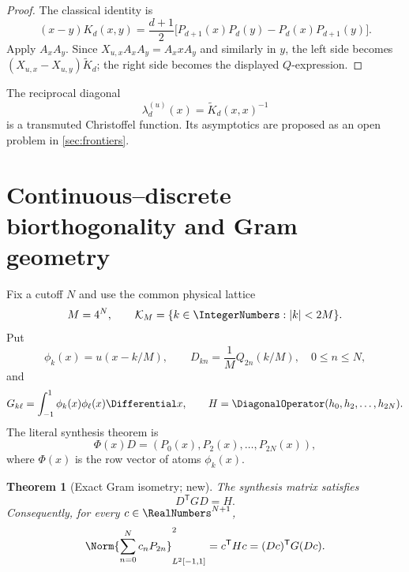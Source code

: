 \documentclass[11pt,oneside]{article}
\numberwithin{equation}{section}
\newtheorem{theorem}{Theorem}[section]
\theoremstyle{definition}
\theoremstyle{remark}
\begin{document}
\begin{proof}
The classical identity is
\[
 (x-y)K_d(x,y)=\frac{d+1}{2}
 \bigl[P_{d+1}(x)P_d(y)-P_d(x)P_{d+1}(y)\bigr].
\]
Apply $A_xA_y$.  Since
$X_{u,x}A_xA_y=A_xxA_y$ and similarly in $y$, the left side becomes
$(X_{u,x}-X_{u,y})\widetilde K_d$; the right side becomes the displayed
$Q$-expression.
\end{proof}

The reciprocal diagonal
\begin{equation}
 \lambda_d^{(u)}(x)=\widetilde K_d(x,x)^{-1}
 \label{eq:transmuted-Christoffel}
\end{equation}
is a transmuted Christoffel function.  Its asymptotics are proposed as an open
problem in \cref{sec:frontiers}.

\section{Continuous--discrete biorthogonality and Gram geometry}
\label{sec:gram}

Fix a cutoff $N$ and use the common physical lattice
\begin{equation}
 M=4^N,\qquad \mathcal K_M=\{k\in\IntegerNumbers:|k|<2M\}.
 \label{eq:common-lattice}
\end{equation}
Put
\begin{equation}
 \phi_k(x)=u(x-k/M),\qquad
 D_{kn}=\frac1M Q_{2n}(k/M),\quad 0\le n\le N,
 \label{eq:D-matrix}
\end{equation}
and
\begin{equation}
 G_{k\ell}=\int_{-1}^{1}\phi_k(x)\phi_\ell(x)\Differential x,
 \qquad H=\DiagonalOperator(h_0,h_2,\ldots,h_{2N}).
 \label{eq:G-H}
\end{equation}
The literal synthesis theorem is
\begin{equation}
 \Phi(x)D=(P_0(x),P_2(x),\ldots,P_{2N}(x)),
 \label{eq:PhiD}
\end{equation}
where $\Phi(x)$ is the row vector of atoms $\phi_k(x)$.

\begin{theorem}[Exact Gram isometry; new]
\label{thm:Gram-isometry}
The synthesis matrix satisfies
\begin{equation}
 \boxed{D^{\mathsf T}GD=H.}
 \label{eq:DtGD}
\end{equation}
Consequently, for every $c\in\RealNumbers^{N+1}$,
\begin{equation}
 \Norm{\sum_{n=0}^{N}c_nP_{2n}}_{L^2[-1,1]}^2
 =c^{\mathsf T}Hc=(Dc)^{\mathsf T}G(Dc).
 \label{eq:energy-isometry}
\end{equation}
\end{theorem}
\end{document}
